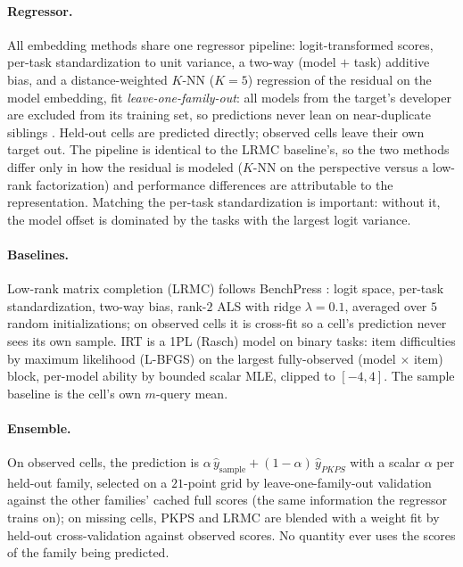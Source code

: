\documentclass{article}
\theoremstyle{definition}
\theoremstyle{plain}
\newcommand{\PKPS}{PKPS\xspace}
\begin{document}
\paragraph{Regressor.} All embedding methods share one regressor pipeline: logit-transformed
scores, per-task standardization to unit variance, a two-way (model $+$ task) additive
bias, and a distance-weighted $K$-NN ($K{=}5$) regression of the residual on the model
embedding, fit \emph{leave-one-family-out}: all models from the target's developer are
excluded from its training set, so predictions never lean on near-duplicate siblings
\citep{dkps_qeff}. Held-out cells are predicted directly; observed cells leave their own
target out. The pipeline is identical to the LRMC baseline's, so the two methods differ
only in how the residual is modeled ($K$-NN on the perspective versus a low-rank
factorization) and performance differences are attributable to the representation.
Matching the per-task standardization is important: without it, the model offset is
dominated by the tasks with the largest logit variance.

\paragraph{Baselines.} Low-rank matrix completion (LRMC) follows BenchPress \citep{benchpress}: logit
space, per-task standardization, two-way bias, rank-$2$ ALS with ridge $\lambda{=}0.1$,
averaged over $5$ random initializations; on observed cells it is cross-fit so a cell's
prediction never sees its own sample. IRT is a 1PL (Rasch) model on binary tasks: item
difficulties by maximum likelihood (L-BFGS) on the largest fully-observed
(model $\times$ item) block, per-model ability by bounded scalar MLE, clipped to
$[-4,4]$. The sample baseline is the cell's own $m$-query mean.

\paragraph{Ensemble.} On observed cells, the prediction is $\alpha\,\hat
y_{\mathrm{sample}}+(1-\alpha)\,\hat y_{\PKPS}$ with a scalar $\alpha$ per held-out
family, selected on a $21$-point grid by leave-one-family-out validation against the
other families' cached full scores (the same information the regressor trains on); on
missing cells, \PKPS and LRMC are blended with a weight fit by held-out cross-validation
against observed scores. No quantity ever uses the scores of the family being predicted.
\end{document}
